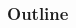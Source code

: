 
\placelogotrue
\begin{frame}
  \frametitle{Outline}
  \vspace{-0.3cm}
  \begin{columns}[c]
      \begin{column}{0.5\textwidth}
        \tableofcontents[sections=1]
        \vspace{0.3cm}
        \tableofcontents[sections=2]
        \vspace{0.3cm}
        \tableofcontents[sections=3]
      \end{column}
      \begin{column}{0.5\textwidth}
        \vspace{0.3cm}
        \tableofcontents[sections=4]
        \vspace{0.3cm}
        \tableofcontents[sections=5]
      \end{column}
  \end{columns}
\end{frame}
\placelogofalse
